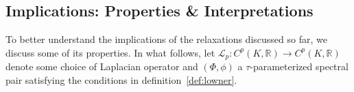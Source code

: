 \documentclass[10pt]{article}
\numberwithin{equation}{section}
\newcommand{\+}{%
	\raisebox{0.18ex}{\scaleobj{0.55}{+}}
}
\theoremstyle{definition}
\theoremstyle{definition}
\begin{document}
\subsection{Implications: Properties \& Interpretations}\label{sec:spri_properties}
To better understand the implications of the relaxations discussed so far, we discuss some of its properties. 
In what follows, let $\mathcal{L}_p : C^p(K, \mathbb{R}) \to C^p(K, \mathbb{R})$ denote some choice of Laplacian operator and $(\Phi, \phi)$ a $\tau$-parameterized spectral pair satisfying the conditions in definition~\ref{def:lowner}. 
\end{document}
